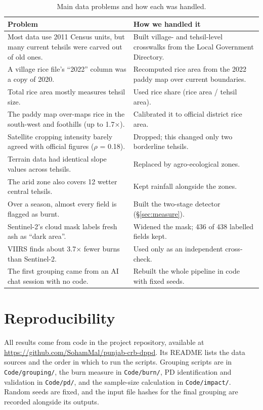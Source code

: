 \documentclass[sigconf,nonacm]{acmart}
\begin{document}
\begin{table}[h]
\caption{Main data problems and how each was handled.}
\label{tab:problems}
\small
\begin{tabularx}{\columnwidth}{@{}>{\raggedright\arraybackslash}p{} >{\raggedright\arraybackslash}X@{}}
\toprule
Problem & How we handled it \\
\midrule
Most data use 2011 Census units, but many current tehsils were carved out of old ones. & Built village- and tehsil-level crosswalks from the Local Government Directory. \\
A village rice file's ``2022'' column was a copy of 2020. & Recomputed rice area from the 2022 paddy map over current boundaries. \\
Total rice area mostly measures tehsil size. & Used rice share (rice area / tehsil area). \\
The paddy map over-maps rice in the south-west and foothills (up to 1.7$\times$). & Calibrated it to official district rice area. \\
Satellite cropping intensity barely agreed with official figures ($\rho$ = 0.18). & Dropped; this changed only two borderline tehsils. \\
Terrain data had identical slope values across tehsils. & Replaced by agro-ecological zones. \\
The arid zone also covers 12 wetter central tehsils. & Kept rainfall alongside the zones. \\
Over a season, almost every field is flagged as burnt. & Built the two-stage detector (\S\ref{sec:measure}). \\
Sentinel-2's cloud mask labels fresh ash as ``dark area''. & Widened the mask; 436 of 438 labelled fields kept. \\
VIIRS finds about 3.7$\times$ fewer burns than Sentinel-2. & Used only as an independent cross-check. \\
The first grouping came from an AI chat session with no code. & Rebuilt the whole pipeline in code with fixed seeds. \\
\bottomrule
\end{tabularx}
\end{table}

\section{Reproducibility}

All results come from code in the project repository, available at \url{https://github.com/SohamMal/punjab-crb-dppd}. Its README lists the data sources and the order in which to run the scripts. Grouping scripts are in \texttt{Code/grouping/}, the burn measure in \texttt{Code/burn/}, PD identification and validation in \texttt{Code/pd/}, and the sample-size calculation in \texttt{Code/impact/}. Random seeds are fixed, and the input file hashes for the final grouping are recorded alongside its outputs.
\end{document}
